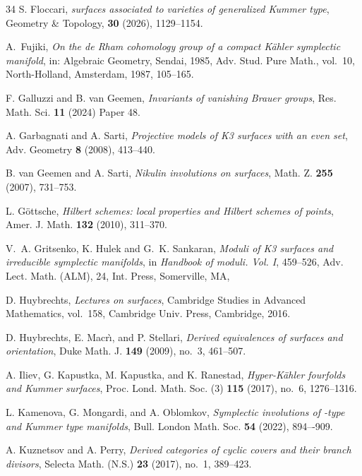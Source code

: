 \documentclass{amsart}
\makeatletter
\theoremstyle{definition}
\numberwithin{equation}{section}
\numberwithin{equation}{section} \theoremstyle{definition}
\newcounter{mathrecordid}
\newcommand{\mathboxbegin}[1]{%
  \stepcounter{mathrecordid}%
  \immediate\write\mathrecords{\themathrecordid,#1}%
  \special{pdf:bann << /Type /Annot /Subtype /Link /Border [0 0 0]
    /MathBoxID \themathrecordid /F 2
    /A << /S /URI /URI (urn:mathbox:\themathrecordid) >> >>}}
\newcommand{\mathboxinlineplain}[1]{$#1$}
\newcommand{\mathboxinline}[1]{%
  $\mathboxbegin{inline}%
  \special{pdf:literal direct /MathBoxBegin\themathrecordid\space MP}%
  #1\special{pdf:literal direct /MathBoxEnd\themathrecordid\space MP}%
  \special{pdf:eann}$}
\newcommand{\recordmath}{%
  \ifmeasuring@\expandafter\mathboxinlineplain
  \else\expandafter\mathboxinline\fi}
\makeatother
\begin{document}
\begin{thebibliography}{34}
 S. Floccari,
  \emph{\recordmath{K3} surfaces associated to varieties of generalized Kummer type},
  Geometry \& Topology, {\bf 30} (2026), 1129--1154.  

A.~Fujiki, \emph{On the de {R}ham cohomology group of a compact {K}\"ahler
symplectic manifold}, in: Algebraic Geometry, {S}endai, 1985,
Adv. Stud. Pure Math., vol.~10, North-Holland, Amsterdam, 1987, 105--165.
  

 F. Galluzzi and B. van Geemen,
  \emph{Invariants of vanishing Brauer groups}, Res. Math. Sci. {\bf 11} (2024) Paper 48.

 A. Garbagnati and A. Sarti, \emph{Projective models of K3 surfaces with an even set}, Adv. Geometry {\bf 8} (2008), 413--440.

 B. van Geemen and A. Sarti,
  \emph{Nikulin involutions on \recordmath{K3} surfaces}, Math. Z. {\bf 255} (2007),
  731--753.

 L. G\"ottsche,
  \emph{Hilbert schemes: local properties and Hilbert schemes of points},
  Amer. J. Math. {\bf 132} (2010), 311--370.

 V.~A. Gritsenko, K. Hulek and G.~K. Sankaran, \emph{Moduli of K3 surfaces and irreducible symplectic manifolds}, in {\it Handbook of moduli. Vol. I}, 459--526, Adv. Lect. Math. (ALM), 24, Int. Press, Somerville, MA,


 D. Huybrechts,
  \emph{Lectures on \recordmath{K3} surfaces}, Cambridge Studies in Advanced Mathematics,
  vol.~158, Cambridge Univ. Press, Cambridge, 2016.

 D. Huybrechts, E. Macr\`\i, and P. Stellari,
  \emph{Derived equivalences of \recordmath{K3} surfaces and orientation},
  Duke Math. J. {\bf 149} (2009), no.~3, 461--507. %


 A. Iliev, G. Kapustka, M. Kapustka, and K. Ranestad,
  \emph{Hyper-K\"ahler fourfolds and Kummer surfaces},
  Proc. Lond. Math. Soc. (3) {\bf 115} (2017), no.~6, 1276--1316.

 L. Kamenova, G. Mongardi, and A. Oblomkov,
  \emph{Symplectic involutions of \recordmath{K3^{[n]}}-type and Kummer \recordmath{n} type
  manifolds}, Bull. London Math. Soc. {\bf 54} (2022), 894–-909.

 A. Kuznetsov and A. Perry,
  \emph{Derived categories of cyclic covers and their branch divisors},
  Selecta Math. (N.S.) {\bf 23} (2017), no.~1, 389--423.


\end{thebibliography}
\end{document}
